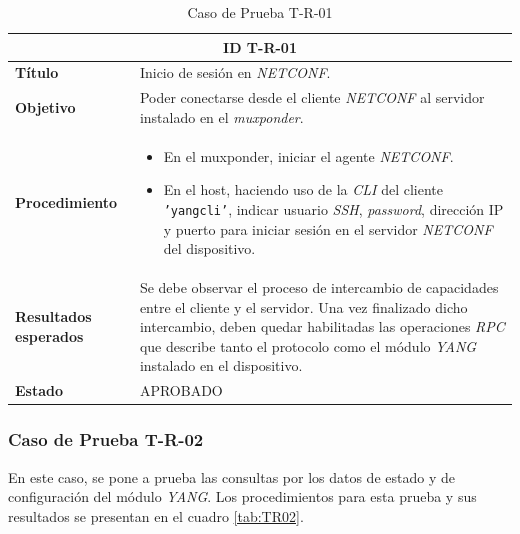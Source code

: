 \begin{table}[H]
\centering
\begin{tabular}{ |m{2.5cm}|m{11cm}|  }
\hline
\multicolumn{2}{|c|}{ \textbf{ID T-R-01} } \\
\hline
\centering
\textbf{Título} & Inicio de sesión en \textit{NETCONF}. \\
\hline
\centering
\textbf{Objetivo} & Poder conectarse desde el cliente \textit{NETCONF} al servidor instalado en el \textit{muxponder}.  \\
\hline
\centering
\textbf{Procedimiento} & \begin{itemize}
  \item En el muxponder, iniciar el agente \textit{NETCONF}.   
  \item En el host, haciendo uso de la \textit{CLI} del cliente \texttt{'yangcli'}, indicar usuario \textit{SSH}, \textit{password}, dirección IP y puerto para iniciar sesión en el servidor \textit{NETCONF} del dispositivo.
\end{itemize}     \\
\hline
\centering
\textbf{Resultados esperados} & 
Se debe observar el proceso de intercambio de capacidades entre el cliente y el servidor. 
Una vez finalizado dicho intercambio, deben quedar habilitadas las operaciones \textit{RPC} que describe tanto el protocolo como el módulo \textit{YANG} instalado en el dispositivo.
  \\

  \hline
\centering
  \textbf{Estado}    & APROBADO  \\
\hline
\end{tabular}

\caption{Caso de Prueba T-R-01}
\label{tab:TR01}
\end{table}



  \subsubsection{Caso de Prueba T-R-02}
  En este caso, se pone a prueba las consultas por los datos de estado y de configuración del módulo \textit{YANG}. Los procedimientos para esta prueba y sus resultados se presentan en el cuadro \ref{tab:TR02}. 

